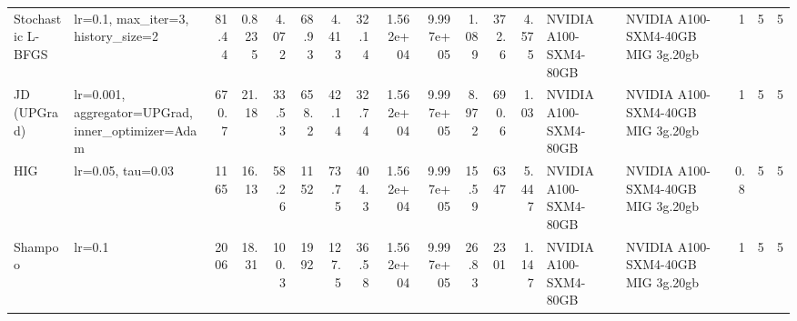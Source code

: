 \begin{tabular}{llrrrrrrrrrrrllrrr}
Stochastic L-BFGS & lr=0.1, max\_iter=3, history\_size=2 & 81.44 & 0.8235 & 4.072 & 68.93 & 4.413 & 32.14 & 1.562e+04 & 9.997e+05 & 1.089 & 372.6 & 4.575 & NVIDIA A100-SXM4-80GB & NVIDIA A100-SXM4-40GB MIG 3g.20gb & 1 & 5 & 5 \\
JD (UPGrad) & lr=0.001, aggregator=UPGrad, inner\_optimizer=Adam & 670.7 & 21.18 & 33.53 & 658.2 & 42.14 & 32.74 & 1.562e+04 & 9.997e+05 & 8.972 & 690.6 & 1.03 & NVIDIA A100-SXM4-80GB & NVIDIA A100-SXM4-40GB MIG 3g.20gb & 1 & 5 & 5 \\
HIG & lr=0.05, tau=0.03 & 1165 & 16.13 & 58.26 & 1152 & 73.75 & 404.3 & 1.562e+04 & 9.997e+05 & 15.59 & 6347 & 5.447 & NVIDIA A100-SXM4-80GB & NVIDIA A100-SXM4-40GB MIG 3g.20gb & 0.8 & 5 & 5 \\
Shampoo & lr=0.1 & 2006 & 18.31 & 100.3 & 1992 & 127.5 & 36.58 & 1.562e+04 & 9.997e+05 & 26.83 & 2301 & 1.147 & NVIDIA A100-SXM4-80GB & NVIDIA A100-SXM4-40GB MIG 3g.20gb & 1 & 5 & 5 \\
\bottomrule
\end{tabular}

